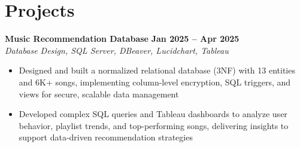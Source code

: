 \documentclass[letterpaper,11pt]{article}
\begin{document}
\section{Projects}

\textbf{Music Recommendation Database} \hfill \textbf{Jan 2025 -- Apr 2025}\\
\textit{Database Design, SQL Server, DBeaver, Lucidchart, Tableau}
\begin{itemize}
  \item Designed and built a normalized relational database (3NF) with 13 entities and 6K+ songs, implementing
        column-level encryption, SQL triggers, and views for secure, scalable data management
  \item Developed complex SQL queries and Tableau dashboards to analyze user behavior, playlist trends, and
        top-performing songs, delivering insights to support data-driven recommendation strategies
\end{itemize}
\end{document}

